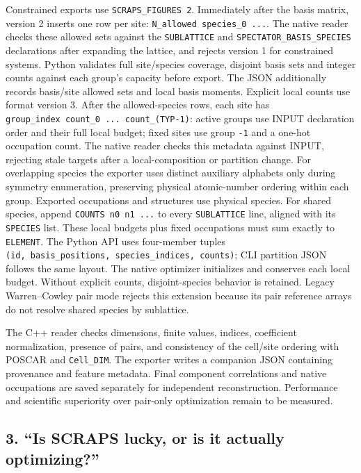 \documentclass[
  11pt,
]{article}
\begin{document}
Constrained exports use \texttt{SCRAPS\_FIGURES\ 2}. Immediately after
the basis matrix, version 2 inserts one row per site:
\texttt{N\_allowed\ species\_0\ ...}. The native reader checks these
allowed sets against the \texttt{SUBLATTICE} and
\texttt{SPECTATOR\_BASIS\_SPECIES} declarations after expanding the
lattice, and rejects version 1 for constrained systems. Python validates
full site/species coverage, disjoint basis sets and integer counts
against each group's capacity before export. The JSON additionally
records basis/site allowed sets and local basis moments. Explicit local
counts use format version 3. After the allowed-species rows, each site
has \texttt{group\_index\ count\_0\ ...\ count\_(TYP-1)}: active groups
use INPUT declaration order and their full local budget; fixed sites use
group \texttt{-1} and a one-hot occupation count. The native reader
checks this metadata against INPUT, rejecting stale targets after a
local-composition or partition change. For overlapping species the
exporter uses distinct auxiliary alphabets only during symmetry
enumeration, preserving physical atomic-number ordering within each
group. Exported occupations and structures use physical species. For
shared species, append \texttt{COUNTS\ n0\ n1\ ...} to every
\texttt{SUBLATTICE} line, aligned with its \texttt{SPECIES} list. These
local budgets plus fixed occupations must sum exactly to
\texttt{ELEMENT}. The Python API uses four-member tuples
\texttt{(id,\ basis\_positions,\ species\_indices,\ counts)}; CLI
partition JSON follows the same layout. The native optimizer initializes
and conserves each local budget. Without explicit counts,
disjoint-species behavior is retained. Legacy Warren--Cowley pair mode
rejects this extension because its pair reference arrays do not resolve
shared species by sublattice.

The C++ reader checks dimensions, finite values, indices, coefficient
normalization, presence of pairs, and consistency of the cell/site
ordering with POSCAR and \texttt{Cell\_DIM}. The exporter writes a
companion JSON containing provenance and feature metadata. Final
component correlations and native occupations are saved separately for
independent reconstruction. Performance and scientific superiority over
pair-only optimization remain to be measured.

\subsection{3. ``Is SCRAPS lucky, or is it actually
optimizing?''}\label{is-scraps-lucky-or-is-it-actually-optimizing}
\end{document}

